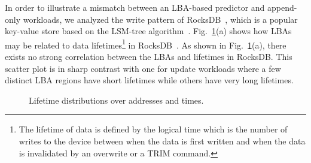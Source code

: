 In order to illustrate a mismatch between an LBA-based predictor and 
append-only workloads, we analyzed the write pattern of 
RocksDB~\cite{RocksDB}, which is a
popular key-value store based on the LSM-tree algorithm~\cite{LSM}.
Fig.~\ref{fig:lba_lifetime}(a) shows how LBAs may be related 
to data lifetimes\footnote{The lifetime of data is defined 
by the logical time which is the number of writes to the device 
between when the data is first written 
and when the data is invalidated by an overwrite or a TRIM command.}
in RocksDB~\cite{RocksDB}.  
As shown in Fig.~\ref{fig:lba_lifetime}(a), 
there exists no strong correlation between the LBAs and lifetimes in RocksDB.  
This scatter plot is in sharp contrast with one for update workloads 
where a few distinct LBA regions have short lifetimes while others 
have very long lifetimes.

\begin{figure}[t]
	\centering
	\hfill
	 \hspace{30pt}  %
	\caption{Lifetime distributions over addresses and times.} %
	\label{fig:lba_lifetime}
\end{figure}


